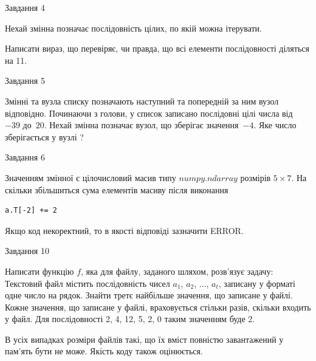 \documentclass[12pt, ukrainian]{article}
\begin{document}
{               
{\begin{center}Завдання {4}\end{center}}
\vspace{-6mm}
Нехай змінна  позначає послідовність цілих, по якій можна ітерувати.

Написати вираз, що перевіряє, чи правда, що всі елементи послідовності діляться на 11.\par

\vspace{10mm}
               
{\begin{center}Завдання {5}\end{center}}
\vspace{-6mm}
Змінні  та  вузла списку позначають наступний та попередній за ним вузол відповідно. Починаючи з голови, у список записано послідовні цілі числа від~$-39$ до~$20$. Нехай змінна  позначає вузол, що зберігає значення~$-4$.
Яке число зберігається у вузлі  ?\par

               
{\begin{center}Завдання {6}\end{center}}
\vspace{-6mm}
Значенням змінної  є цілочисловий масив типу $numpy.ndarray$ розмірів $5{\times}7$. На скільки збільшиться сума елементів масиву  після виконання
\begin{verbatim}
a.T[-2] += 2
\end{verbatim}


Якщо код некоректний, то в якості відповіді зазначити ERROR.\par

               
{\begin{center}Завдання {10}\end{center}}
\vspace{-6mm}

Написати функцію $f$, яка для файлу, заданого шляхом, розв’язує задачу:\\ Текстовий файл містить послідовність чисел $a_1$, $a_2$, $\ldots$, $a_t$, записану у форматі одне число на рядок. Знайти третє найбільше значення, що записане у файлі. Кожне значення, що записане у файлі, враховується стільки разів, скільки входить у файл. Для послідовності 2, 4, 12, 5, 2, 0 таким значенням буде 2.

В усіх випадках розміри файлів такі, що їх вміст повністю завантажений у пам'ять бути не може. Якість коду також оцінюється.



}
\end{document}
